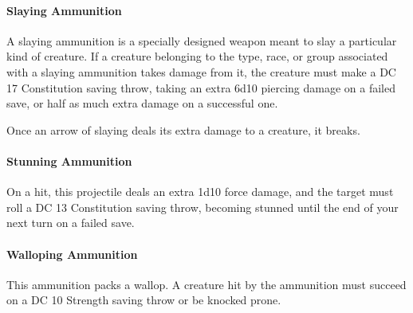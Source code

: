 \paragraph{Slaying Ammunition}
    A slaying ammunition is a specially designed weapon meant to slay a particular kind of creature.
    If a creature belonging to the type, race, or group associated with a slaying ammunition takes damage from it, the creature must make a DC 17 Constitution saving throw, taking an extra 6d10 piercing damage on a failed save, or half as much extra damage on a successful one.

    Once an arrow of slaying deals its extra damage to a creature, it breaks.
\paragraph{Stunning Ammunition}
    On a hit, this projectile deals an extra 1d10 force damage, and the target must roll a DC 13 Constitution saving throw, becoming stunned until the end of your next turn on a failed save.
\paragraph{Walloping Ammunition}
    This ammunition packs a wallop.
    A creature hit by the ammunition must succeed on a DC 10 Strength saving throw or be knocked prone.
\newpage~\newpage
